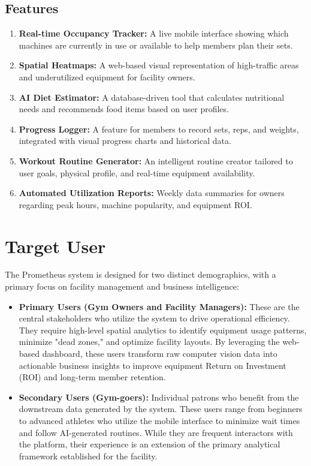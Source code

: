 \subsection{Features}
\label{subsection:features}

\begin{enumerate}[leftmargin=90pt]
    \item \textbf{Real-time Occupancy Tracker:} A live mobile interface showing which machines are currently in use or available to help members plan their sets.
    \item \textbf{Spatial Heatmaps:} A web-based visual representation of high-traffic areas and underutilized equipment for facility owners.
    \item \textbf{AI Diet Estimator:} A database-driven tool that calculates nutritional needs and recommends food items based on user profiles.
    \item \textbf{Progress Logger:} A feature for members to record sets, reps, and weights, integrated with visual progress charts and historical data.
    \item \textbf{Workout Routine Generator:} An intelligent routine creator tailored to user goals, physical profile, and real-time equipment availability.
    \item \textbf{Automated Utilization Reports:} Weekly data summaries for owners regarding peak hours, machine popularity, and equipment ROI.
\end{enumerate}

\section{Target User}
\label{section:target-user}
The Prometheus system is designed for two distinct demographics, with a primary focus on facility management and business intelligence:

\begin{itemize}
    \item \textbf{Primary Users (Gym Owners and Facility Managers):} These are the central stakeholders 
    who utilize the system to drive operational efficiency. They require high-level spatial analytics to 
    identify equipment usage patterns, minimize "dead zones," and optimize facility layouts. By leveraging 
    the web-based dashboard, these users transform raw computer vision data into actionable business insights 
    to improve equipment Return on Investment (ROI) and long-term member retention.
    \item \textbf{Secondary Users (Gym-goers):} Individual patrons who benefit from the downstream data 
    generated by the system. These users range from beginners to advanced athletes who utilize the mobile 
    interface to minimize wait times and follow AI-generated routines. While they are frequent interactors 
    with the platform, their experience is an extension of the primary analytical framework established for 
    the facility.
\end{itemize}

